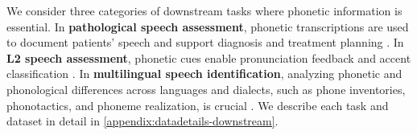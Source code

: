 We consider three categories of downstream tasks where phonetic information is essential. 
In \textbf{pathological speech assessment}, phonetic transcriptions are used to document patients' speech and support diagnosis and treatment planning \cite{ball2009importance, nelson2020use}. 
In \textbf{L2 speech assessment}, phonetic cues enable pronunciation feedback \cite{Franco2010EduSpeakAS} and accent classification \cite{angkititrakul2006phone-based-accent}. 
In \textbf{multilingual speech identification}, analyzing phonetic and phonological differences across languages and dialects, such as phone inventories, phonotactics, and phoneme realization, is crucial \cite{schultz2006multilingualsp}.
We describe each task and dataset in detail in \autoref{appendix:datadetails-downstream}.
